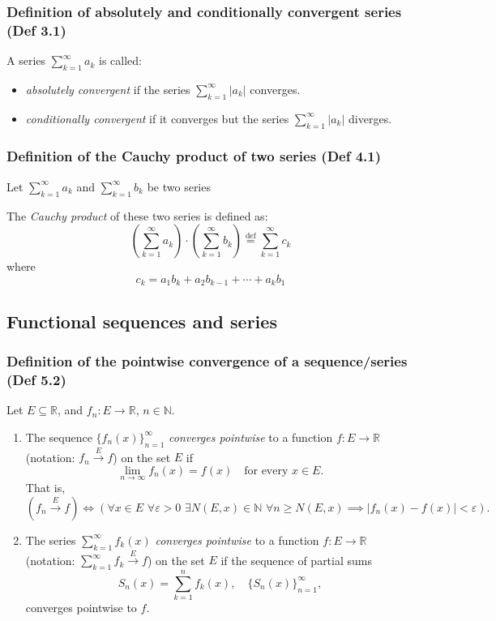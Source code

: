 \subsubsection{Definition of absolutely and conditionally convergent series (Def 3.1)}

A series $\sum_{k=1}^\infty a_k$ is called:
\begin{itemize}
    \item \textit{absolutely convergent} if the series $\sum_{k=1}^\infty |a_k|$ converges.
    \item \textit{conditionally convergent} if it converges but the series $\sum_{k=1}^\infty |a_k|$ diverges.
\end{itemize}

\subsubsection{Definition of the Cauchy product of two series (Def 4.1)}

Let $\sum_{k=1}^\infty a_k$ and $\sum_{k=1}^\infty b_k$ be two series

\vspace{1em}

The \textit{Cauchy product} of these two series is defined as:
\[
    \left( \sum_{k=1}^\infty a_k \right) \cdot \left( \sum_{k=1}^\infty b_k \right) \overset{\text{def}}{=} \sum_{k=1}^\infty c_k
\]
where
\[
    c_k = a_1 b_k + a_2 b_{k-1} + \cdots + a_k b_1
\]

\clearpage

\subsection{Functional sequences and series}

\subsubsection{Definition of the pointwise convergence of a sequence/series (Def 5.2)}

Let $E \subseteq \mathbb{R}$, and $f_n: E \to \mathbb{R}$, $n \in \mathbb{N}$.

\begin{enumerate}
    \item The sequence $\{f_n(x)\}_{n=1}^\infty$ \textit{converges pointwise} to a function $f: E \to \mathbb{R}$ (notation: $f_n \xrightarrow{E} f$) on the set $E$ if
    \[
        \lim_{n \to \infty} f_n(x) = f(x) \quad \text{for every } x \in E.
    \]
    That is,
    \[
        \left(f_n \xrightarrow{E} f\right) \iff
        \left(\forall x \in E \,\, \forall \varepsilon > 0 \,\, \exists N(E, x) \in \mathbb{N} \,\,
        \forall n \geq N(E, x) \implies |f_n(x) - f(x)| < \varepsilon \right).
    \]

    \item The series $\sum_{k=1}^\infty f_k(x)$ \textit{converges pointwise} to a function $f: E \to \mathbb{R}$ (notation: $\sum_{k=1}^\infty f_k \xrightarrow{E} f$) on the set $E$ if the sequence of partial sums
    \[
        S_n(x) = \sum_{k=1}^n f_k(x), \quad \{S_n(x)\}_{n=1}^\infty,
    \]
    converges pointwise to $f$.
\end{enumerate}

